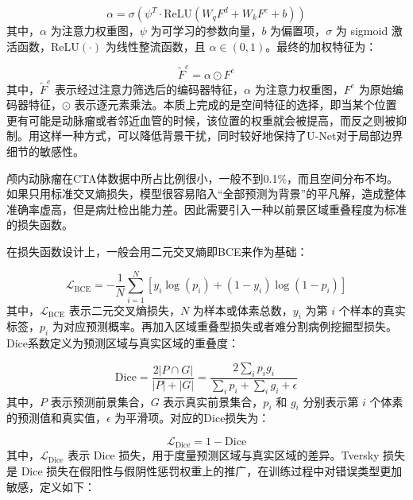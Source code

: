 \begin{equation}
    \alpha = \sigma(\psi^T \cdot \text{ReLU}(W_q F^d + W_k F^e + b))
    \label{eq:attention-alpha}
\end{equation}
其中，$\alpha$ 为注意力权重图，$\psi$ 为可学习的参数向量，$b$ 为偏置项，$\sigma$ 为 sigmoid 激活函数，$\text{ReLU}(\cdot)$ 为线性整流函数，且 $\alpha \in (0,1)$。最终的加权特征为：

\begin{equation}
    \tilde{F}^e = \alpha \odot F^e
    \label{eq:attention-gated}
\end{equation}
其中，$\tilde{F}^e$ 表示经过注意力筛选后的编码器特征，$\alpha$ 为注意力权重图，$F^e$ 为原始编码器特征，$\odot$ 表示逐元素乘法。本质上完成的是空间特征的选择，即当某个位置更有可能是动脉瘤或者邻近血管的时候，该位置的权重就会被提高，而反之则被抑制。用这样一种方式，可以降低背景干扰，同时较好地保持了U-Net对于局部边界细节的敏感性\cite{attention_unet}。


颅内动脉瘤在CTA体数据中所占比例很小，一般不到0.1\%，而且空间分布不均。如果只用标准交叉熵损失，模型很容易陷入“全部预测为背景”的平凡解，造成整体准确率虚高，但是病灶检出能力差。因此需要引入一种以前景区域重叠程度为标准的损失函数。

在损失函数设计上，一般会用二元交叉熵即BCE来作为基础：

\begin{equation}
    \mathcal{L}_{\text{BCE}} = -\frac{1}{N}\sum_{i=1}^{N} \left[ y_i \log(p_i) + (1-y_i)\log(1-p_i) \right]
    \label{eq:bce}
\end{equation}
其中，$\mathcal{L}_{\text{BCE}}$ 表示二元交叉熵损失，$N$ 为样本或体素总数，$y_i$ 为第 $i$ 个样本的真实标签，$p_i$ 为对应预测概率。再加入区域重叠型损失或者难分割病例挖掘型损失\cite{sudre2017generaliseddice,salehi2017tversky,lin2017focal}。Dice系数定义为预测区域与真实区域的重叠度：

\begin{equation}
    \text{Dice} = \frac{2|P \cap G|}{|P| + |G|} = \frac{2\sum_{i} p_i g_i}{\sum_{i} p_i + \sum_{i} g_i + \epsilon}
    \label{eq:dice}
\end{equation}
其中，$P$ 表示预测前景集合，$G$ 表示真实前景集合，$p_i$ 和 $g_i$ 分别表示第 $i$ 个体素的预测值和真实值，$\epsilon$ 为平滑项。对应的Dice损失为：

\begin{equation}
    \mathcal{L}_{\text{Dice}} = 1 - \text{Dice}
    \label{eq:dice-loss}
\end{equation}
其中，$\mathcal{L}_{\text{Dice}}$ 表示 Dice 损失，用于度量预测区域与真实区域的差异。Tversky 损失是 Dice 损失在假阳性与假阴性惩罚权重上的推广，在训练过程中对错误类型更加敏感，定义如下：

